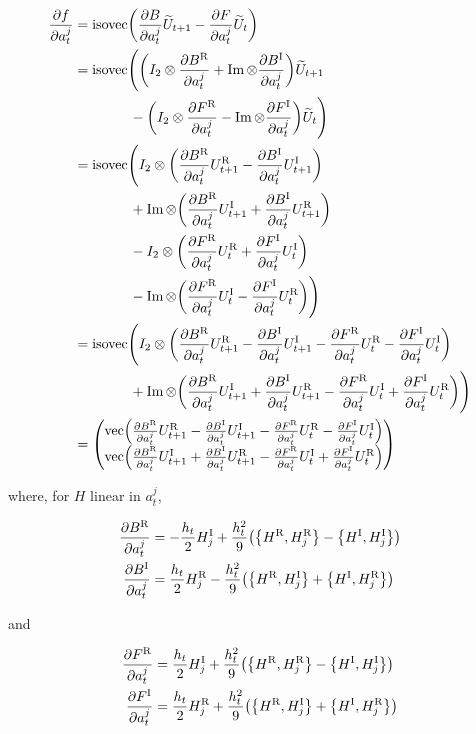 \documentclass{article}
\newcommand{\isoU}{\widetilde{U}}
\newcommand{\isovec}{\text{isovec}}
\newcommand{\HI}{H^{\text{I}}}
\newcommand{\HR}{H^{\text{R}}}
\newcommand{\BR}{B^{\text{R}}}
\newcommand{\BI}{B^{\text{I}}}
\newcommand{\FR}{F^{\text{R}}}
\newcommand{\FI}{F^{\text{I}}}
\newcommand{\UR}{U^{\text{R}}}
\newcommand{\UI}{U^{\text{I}}}
\begin{document}
\begin{align*}
  \pdv{f}{a^j_t} &= \isovec\qty(\pdv{B}{a^j_t} \isoU_{t+1} - \pdv{F}{a^j_t} \isoU_t) \\
  &= \isovec\Bigg(\qty(I_2 \otimes \pdv{\BR}{a^j_t} + \Im \otimes \pdv{\BI}{a^j_t}) \isoU_{t+1} \\
  & \quad \quad \quad \quad - \qty(I_2 \otimes \pdv{\FR}{a^j_t} - \Im \otimes \pdv{\FI}{a^j_t}) \isoU_t\Bigg) \\
  &= \isovec\Bigg( I_2 \otimes \qty(\pdv{\BR}{a^j_t} \UR_{t+1} - \pdv{\BI}{a^j_t} \UI_{t+1}) \\
  & \quad \quad \quad \quad + \Im \otimes \qty(\pdv{\BR}{a^j_t} \UI_{t+1} + \pdv{\BI}{a^j_t} \UR_{t+1}) \\
  & \quad \quad \quad \quad - I_2 \otimes \qty(\pdv{\FR}{a^j_t} \UR_t + \pdv{\FI}{a^j_t} \UI_t) \\
  & \quad \quad \quad \quad - \Im \otimes \qty(\pdv{\FR}{a^j_t} \UI_t - \pdv{\FI}{a^j_t} \UR_t)\Bigg) \\
  &= \isovec\Bigg( I_2 \otimes \qty(\pdv{\BR}{a^j_t} \UR_{t+1} - \pdv{\BI}{a^j_t} \UI_{t+1} - \pdv{\FR}{a^j_t} \UR_t - \pdv{\FI}{a^j_t} \UI_t) \\
  & \quad \quad \quad \quad + \Im \otimes \qty(\pdv{\BR}{a^j_t} \UI_{t+1} + \pdv{\BI}{a^j_t} \UR_{t+1} - \pdv{\FR}{a^j_t} \UI_t + \pdv{\FI}{a^j_t} \UR_t)\Bigg) \\
  &= \mqty(
    \text{vec} \qty(\pdv{\BR}{a^j_t} \UR_{t+1} - \pdv{\BI}{a^j_t} \UI_{t+1} - \pdv{\FR}{a^j_t} \UR_t - \pdv{\FI}{a^j_t} \UI_t)\\
    \text{vec}\qty(\pdv{\BR}{a^j_t} \UI_{t+1} + \pdv{\BI}{a^j_t} \UR_{t+1} - \pdv{\FR}{a^j_t} \UI_t + \pdv{\FI}{a^j_t} \UR_t)
    )
\end{align*}

where, for $H$ linear in $a^j_t$, 

\begin{align*}
  \pdv{\BR}{a^j_t} &= -\frac{h_t}{2} \HI_j + \frac{h_t^2}{9} \qty(\qty{\HR,\HR_j} - \qty{\HI, \HI_j}) \\
  \pdv{\BI}{a^j_t} &= \frac{h_t}{2} \HR_j - \frac{h_t^2}{9} \qty(\qty{\HR,\HI_j} + \qty{\HI,\HR_j})
\end{align*}

and 

\begin{align*}
  \pdv{\FR}{a^j_t} &= \frac{h_t}{2} \HI_j + \frac{h_t^2}{9} \qty(\qty{\HR,\HR_j} - \qty{\HI, \HI_j}) \\
  \pdv{\FI}{a^j_t} &= \frac{h_t}{2} \HR_j + \frac{h_t^2}{9} \qty(\qty{\HR,\HI_j} + \qty{\HI,\HR_j})
\end{align*}
\end{document}
